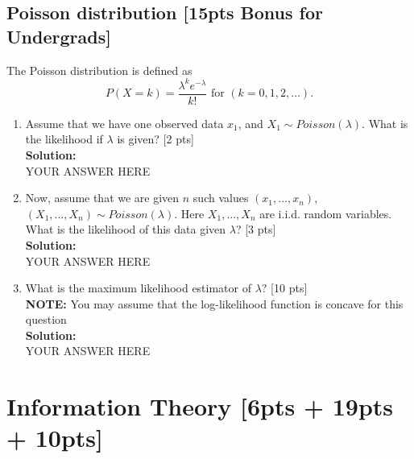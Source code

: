 \documentclass{article}
\begin{document}
\subsection{Poisson distribution [15pts Bonus for Undergrads]}
The Poisson distribution is defined as 
$$P(X=k)=\frac{\lambda^k e^{-\lambda}}{k!} \text{ for } (k=0,1,2,...).$$
\begin{enumerate}[label=(\alph*)]
\item Assume that we have one observed data $x_1$, and $X_1 \sim Poisson(\lambda)$. What is the likelihood if $ \lambda$ is given? [2 pts]\bigskip \\
\textbf{Solution:}\\
YOUR ANSWER HERE
\newpage
\item Now, assume that we are given $n$ such values $(x_1,...,x_n)$, $(X_1, ...,X_n)\sim Poisson(\lambda)$. Here $X_1, ...,X_n$ are i.i.d. random variables. What is the likelihood of this data given $\lambda$? [3 pts]\bigskip \\
\textbf{Solution:}\\
YOUR ANSWER HERE
\newpage
\item What is the maximum likelihood estimator of $\lambda$? [10 pts] \\
\textbf{NOTE: }You may assume that the log-likelihood function is concave for this question\bigskip \\
\textbf{Solution:}\\
YOUR ANSWER HERE
\newpage
\end{enumerate}



\section{Information Theory [6pts + 19pts + 10pts]}
\end{document}
